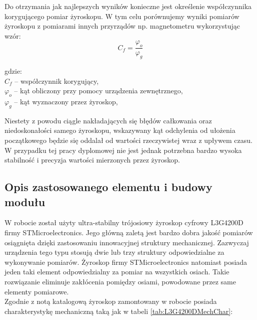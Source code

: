 Do otrzymania jak najlepszych wyników konieczne jest określenie współczynnika korygującego pomiar żyroskopu.
W tym celu porównujemy wyniki pomiarów żyroskopu z pomiarami innych przyrządów np. magnetometru wykorzystując wzór:
\begin{equation}
  C_{f} = \frac{\varphi_{o}}{\varphi_{g}}
\end{equation}
\begin{tabbing}
  gdzie: \= \\
    \> $C_{f}$ -- współczynnik korygujący, \\
    \> $\varphi_{o}$ -- kąt obliczony przy pomocy urządzenia zewnętrznego,\\
    \> $\varphi_{g}$ -- kąt wyznaczony przez żyroskop,\\
\end{tabbing}

Niestety z powodu ciągle nakładających się błędów całkowania oraz niedoskonałości samego żyroskopu, wskazywany kąt odchylenia od ułożenia początkowego będzie się oddalał od wartości rzeczywistej wraz z upływem czasu. W przypadku tej pracy dyplomowej nie jest jednak potrzebna bardzo wysoka stabilność i precyzja wartości mierzonych przez żyroskop.

\subsection{Opis zastosowanego elementu i budowy modułu}
W robocie został użyty ultra-stabilny trójosiowy żyroskop cyfrowy L3G4200D firmy STMicroelectronics. Jego główną zaletą jest bardzo dobra jakość pomiarów osiągnięta dzięki zastosowaniu innowacyjnej struktury mechanicznej. Zazwyczaj urządzenia tego typu stosują dwie lub trzy struktury odpowiedzialne za wykonywanie pomiarów. Żyroskop firmy STMicroelectronics natomiast posiada jeden taki element odpowiedzialny za pomiar na wszystkich osiach. Takie rozwiązanie eliminuje zakłócenia pomiędzy osiami, powodowane przez same elementy pomiarowe.
\\

Zgodnie z notą katalogową\cite{L3G4200DDataSheet} żyroskop zamontowany w robocie posiada charakterystykę mechaniczną taką jak w tabeli \ref{tab:L3G4200DMechChar}:

